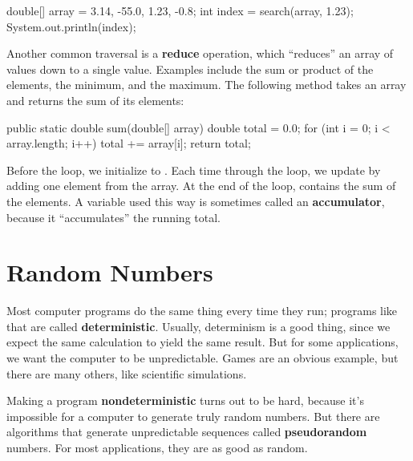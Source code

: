 \begin{code}
double[] array = {3.14, -55.0, 1.23, -0.8};
int index = search(array, 1.23);
System.out.println(index);
\end{code}


Another common traversal is a {\bf reduce} operation, which ``reduces'' an array of values down to a single value.
Examples include the sum or product of the elements, the minimum, and the maximum.
The following method takes an array and returns the sum of its elements:

\begin{code}
public static double sum(double[] array) {
    double total = 0.0;
    for (int i = 0; i < array.length; i++) {
        total += array[i];
    }
    return total;
}
\end{code}


Before the loop, we initialize  to .
Each time through the loop, we update  by adding one element from the array.
At the end of the loop,  contains the sum of the elements.
A variable used this way is sometimes called an {\bf accumulator}, because it ``accumulates'' the running total.


\section{Random Numbers}
\label{random}


Most computer programs do the same thing every time they run; programs like that are called {\bf deterministic}.
Usually, determinism is a good thing, since we expect the same calculation to yield the same result.
But for some applications, we want the computer to be unpredictable.
Games are an obvious example, but there are many others, like scientific simulations.



Making a program {\bf nondeterministic} turns out to be hard, because it's impossible for a computer to generate truly random numbers.
But there are algorithms that generate unpredictable sequences called {\bf pseudorandom} numbers.
For most applications, they are as good as random.

